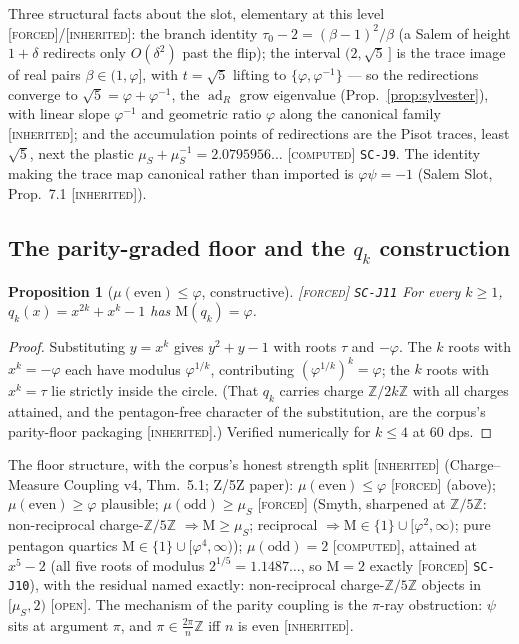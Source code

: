 \documentclass[11pt]{article}
\newcommand{\tagF}{\textcolor{cF}{\textsc{[forced]}}}
\newcommand{\tagC}{\textcolor{cC}{\textsc{[computed]}}}
\newcommand{\tagI}{\textcolor{cI}{\textsc{[inherited]}}}
\newcommand{\tagO}{\textcolor{cO}{\textsc{[open]}}}
\newcommand{\hx}[1]{\textcolor{cC}{\footnotesize\texttt{#1}}}
\newcommand{\Z}{\mathbb{Z}}
\newcommand{\gp}{\varphi}
\newcommand{\gq}{\psi}
\newcommand{\M}{\mathrm{M}}
\newcommand{\adR}{\operatorname{ad}_R}
\theoremstyle{plain}
\newtheorem{proposition}[theorem]{Proposition}
\theoremstyle{definition}
\theoremstyle{remark}
\begin{document}
Three structural facts about the slot, elementary at this level \tagF{}/\tagI{}:
the branch identity $\tau_0-2=(\beta-1)^2/\beta$ (a Salem of height $1+\delta$
redirects only $O(\delta^2)$ past the flip); the interval $(2,\sqrt5\,]$ is the trace
image of real pairs $\beta\in(1,\gp]$, with $t=\sqrt5$ lifting to $\{\gp,\gp^{-1}\}$
--- so the redirections converge to $\sqrt5=\gp+\gp^{-1}$, the $\adR$ grow eigenvalue
(Prop.~\ref{prop:sylvester}), with linear slope $\gp^{-1}$ and geometric ratio $\gp$
along the canonical family \tagI{}; and the accumulation points of redirections are
the Pisot traces, least $\sqrt5$, next the plastic
$\mu_S+\mu_S^{-1}=2.0795956\ldots$ \tagC{} \hx{SC-J9}. The identity making the trace
map canonical rather than imported is $\gp\gq=-1$ (Salem Slot, Prop.\ 7.1 \tagI{}).

\subsection{The parity-graded floor and the $q_k$ construction}\label{sec:parity}

\begin{proposition}[$\mu(\text{even})\le\gp$, constructive]\label{prop:qk}\tagF{} \hx{SC-J11}
For every $k\ge1$, $q_k(x)=x^{2k}+x^k-1$ has $\M(q_k)=\gp$.
\end{proposition}

\begin{proof}
Substituting $y=x^k$ gives $y^2+y-1$ with roots $\tau$ and $-\gp$. The $k$ roots with
$x^k=-\gp$ each have modulus $\gp^{1/k}$, contributing $(\gp^{1/k})^k=\gp$; the $k$
roots with $x^k=\tau$ lie strictly inside the circle. (That $q_k$ carries charge
$\Z/2k\Z$ with all charges attained, and the pentagon-free character of the
substitution, are the corpus's parity-floor packaging \tagI{}.) Verified numerically
for $k\le4$ at 60 dps.
\end{proof}

The floor structure, with the corpus's honest strength split \tagI{} (Charge--Measure
Coupling v4, Thm.\ 5.1; Z/5Z paper): $\mu(\text{even})\le\gp$ \tagF{} (above);
$\mu(\text{even})\ge\gp$ plausible; $\mu(\text{odd})\ge\mu_S$ \tagF{} (Smyth, sharpened
at $\Z/5\Z$: non-reciprocal charge-$\Z/5\Z$ $\Rightarrow \M\ge\mu_S$; reciprocal
$\Rightarrow \M\in\{1\}\cup[\gp^2,\infty)$; pure pentagon quartics
$\M\in\{1\}\cup[\gp^4,\infty)$); $\mu(\text{odd})=2$ \tagC{}, attained at $x^5-2$
(all five roots of modulus $2^{1/5}=1.1487\ldots$, so $\M=2$ exactly \tagF{}
\hx{SC-J10}), with the residual named exactly: non-reciprocal charge-$\Z/5\Z$ objects
in $[\mu_S,2)$ \tagO{}. The mechanism of the parity coupling is the $\pi$-ray
obstruction: $\gq$ sits at argument $\pi$, and $\pi\in\tfrac{2\pi}{n}\Z$ iff $n$ is
even \tagI{}.
\end{document}
